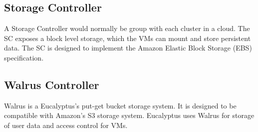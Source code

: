 \subsection{Storage Controller}
A Storage Controller would normally be group with each cluster in a cloud.  The SC exposes a block level storage, which the VMs can mount and store persistent data.  The SC is designed to implement the Amazon Elastic Block Storage (EBS) specification.

\subsection{Walrus Controller}
Walrus is a Eucalyptus's put-get bucket storage system.  It is designed to be compatible with Amazon's S3 storage system.  Eucalyptus uses Walrus for storage of user data and access control for VMs.